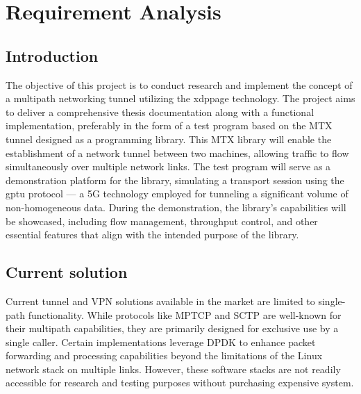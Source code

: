 \chapter{Requirement Analysis}\label{sec:reqs}\minitoc\vspace{.5cm}

\section{Introduction}
The objective of this project is to conduct research and implement the concept of a multipath networking tunnel utilizing the \ac{xdppage} technology. The project aims to deliver a comprehensive thesis documentation along with a functional implementation, preferably in the form of a test program based on the \ac{MTX} tunnel designed as a programming library.
This \ac{MTX} library will enable the establishment of a network tunnel between two machines, allowing traffic to flow simultaneously over multiple network links. 
The test program will serve as a demonstration platform for the library, simulating a transport session using the \ac{gptu} protocol — a 5G technology employed for tunneling a significant volume of non-homogeneous data.
During the demonstration, the library's capabilities will be showcased, including flow management, throughput control, and other essential features that align with the intended purpose of the library.

\section{Current solution}\label{sec:reqs:current_solutions}

Current tunnel and VPN solutions available in the market are limited to single-path functionality. While protocols like \ac{MPTCP} and \ac{SCTP} are well-known for their multipath capabilities, they are primarily designed for exclusive use by a single caller.
Certain implementations leverage DPDK to enhance packet forwarding and processing capabilities beyond the limitations of the Linux network stack on multiple links. 
However, these software stacks are not readily accessible for research and testing purposes without purchasing expensive system.

